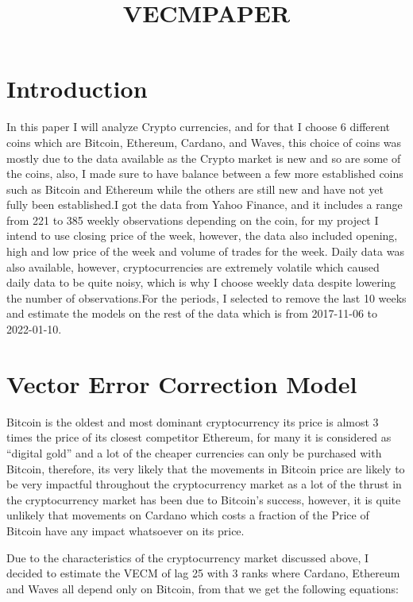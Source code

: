 \documentclass[
]{article}
\title{VECMPAPER}
\author{}
\date{\vspace{-2.5em}}
\begin{document}
\maketitle

\hypertarget{introduction}{%
\section{Introduction}\label{introduction}}

In this paper I will analyze Crypto currencies, and for that I choose 6
different coins which are Bitcoin, Ethereum, Cardano, and Waves, this
choice of coins was mostly due to the data available as the Crypto
market is new and so are some of the coins, also, I made sure to have
balance between a few more established coins such as Bitcoin and
Ethereum while the others are still new and have not yet fully been
established.I got the data from Yahoo Finance, and it includes a range
from 221 to 385 weekly observations depending on the coin, for my
project I intend to use closing price of the week, however, the data
also included opening, high and low price of the week and volume of
trades for the week. Daily data was also available, however,
cryptocurrencies are extremely volatile which caused daily data to be
quite noisy, which is why I choose weekly data despite lowering the
number of observations.For the periods, I selected to remove the last 10
weeks and estimate the models on the rest of the data which is from
2017-11-06 to 2022-01-10.

\hypertarget{vector-error-correction-model}{%
\section{Vector Error Correction
Model}\label{vector-error-correction-model}}

Bitcoin is the oldest and most dominant cryptocurrency its price is
almost 3 times the price of its closest competitor Ethereum, for many it
is considered as ``digital gold'' and a lot of the cheaper currencies
can only be purchased with Bitcoin, therefore, its very likely that the
movements in Bitcoin price are likely to be very impactful throughout
the cryptocurrency market as a lot of the thrust in the cryptocurrency
market has been due to Bitcoin's success, however, it is quite unlikely
that movements on Cardano which costs a fraction of the Price of Bitcoin
have any impact whatsoever on its price.

Due to the characteristics of the cryptocurrency market discussed above,
I decided to estimate the VECM of lag 25 with 3 ranks where Cardano,
Ethereum and Waves all depend only on Bitcoin, from that we get the
following equations:
\end{document}
